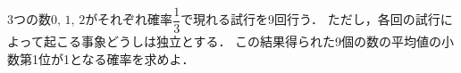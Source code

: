 \documentclass[../../main.tex]{subfiles}
\begin{document}
3つの数$0, \, 1, \, 2$がそれぞれ確率$\displaystyle\dfrac{1}{3}$で現れる試行を9回行う．
ただし，各回の試行によって起こる事象どうしは独立とする．
この結果得られた9個の数の平均値の小数第1位が1となる確率を求めよ．
\end{document}
